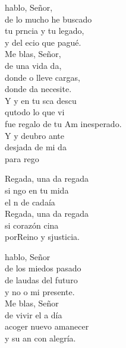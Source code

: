 \begin{cancion}[Regalada][Ixcís]%
	 hablo,	Señor,\\
	de lo mucho he buscado\\
	tu prncia y tu	legado,\\
	y del ecio	que	pagué.\\
	Me blas,	Señor,\\
	de una vida da,\\
	donde o lleve	cargas,	\\
	donde da	necesite.\\
	Y y en tu sca descu\\
	qutodo lo que vi \\
	fue regalo de tu Am inesperado.\\
	Y y deubro ante\\
	desjada de mi da\\
	para  rego\\
	\begin{chorus}%
	Regada, una da regada\\
	si ngo en tu mida \\
	el n de cadaía\\
	Regada, una da regada\\
	si  corazón cina \\
	porReino y sjusticia.\\
	\end{chorus}%
	 hablo, Señor\\
	de los miedos pasado\\
	de laudas del futuro\\
	y no o mi presente.\\
	Me blas, Señor\\
	de vivir el  a día\\
	acoger nuevo amanecer\\
	y su an con alegría. \\

\end{cancion}
